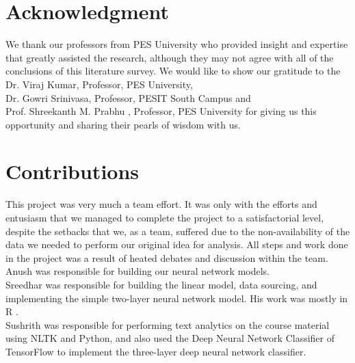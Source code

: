 \documentclass[conference]{IEEEtran}
\begin{document}
	\section*{Acknowledgment}
We thank our professors from PES University who provided insight and expertise that greatly assisted the research, although they may not agree with all of the conclusions of this literature survey. We would like to show our gratitude to the Dr. Viraj Kumar, Professor, PES University,\\  Dr. Gowri Srinivasa, Professor, PESIT South Campus and \\ Prof. Shreekanth M. Prabhu , Professor, PES University for giving us this opportunity and sharing their pearls of wisdom with us.

	\section*{Contributions}
This project was very much a team effort. It was only with the efforts and entusiasm that we managed to complete the project to a satisfactorial level, despite the setbacks that we, as a team, suffered due to the non-availability of the data we needed to perform our original idea for analysis. All steps and work done in the project was a result of heated debates and discussion within the team.\\
Anush was responsible for building our neural network models.\\
Sreedhar was responsible for building the linear model, data sourcing, and implementing the simple two-layer neural network model. His work was mostly in R \cite{r}.\\
Sushrith was responsible for performing text analytics on the course material using NLTK \cite{Loper02nltk:the} and Python, and also used the Deep Neural Network Classifier of TensorFlow \cite{tensorflow2015-whitepaper} to implement the three-layer deep neural network classifier.



\end{document}
